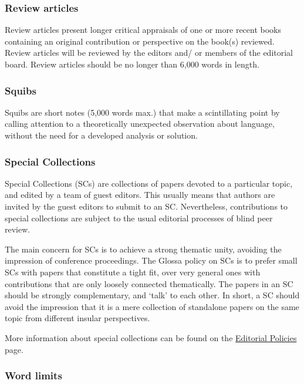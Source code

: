 \documentclass[charis,linguex,biblatex]{glossa}
\begin{document}
\subsubsection{Review articles}

Review articles present longer critical appraisals of one or more recent books containing an original contribution or perspective on the book(s) reviewed. Review articles will be reviewed by the editors and/ or members of the editorial board. Review articles should be no longer than 6,000 words in length.

\subsubsection{Squibs}

Squibs are short notes (5,000 words max.) that make a scintillating point by calling attention to a theoretically unexpected observation about language, without the need for a developed analysis or solution.

\subsubsection{Special Collections}

Special Collections (SCs) are collections of papers devoted to a particular topic, and edited by a team of guest editors. This usually means that authors are invited by the guest editors to submit to an SC. Nevertheless, contributions to special collections are subject to the usual editorial processes of blind peer review. 

The main concern for SCs is to achieve a strong thematic unity, avoiding the impression of conference proceedings. The Glossa policy on SCs is to prefer small SCs with papers that constitute a tight fit, over very general ones with contributions that are only loosely connected thematically. The papers in an SC should be strongly complementary, and ‘talk’ to each other. In short, a SC should avoid the impression that it is a mere collection of standalone papers on the same topic from different insular perspectives.

More information about special collections can be found on the \href{https://www.glossa-journal.org/site/editorial-policies/}{Editorial Policies} page.



\subsubsection{Word limits}
\end{document}
